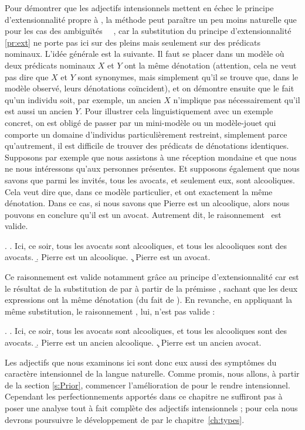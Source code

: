 Pour démontrer que les adjectifs intensionnels mettent en échec le principe d'extensionnalité propre à {\LO}, la méthode peut paraître un peu moins naturelle que pour les cas des ambiguïtés \dedicto\ \vs\ \dere, car la substitution du principe d'extensionnalité \ref{pr:ext} ne porte pas ici sur des {\GN} pleins mais  seulement sur des prédicats nominaux. L'idée générale est la suivante. Il faut se placer dans un modèle où deux prédicats nominaux $X$ et $Y$ ont la même dénotation (attention, cela ne veut pas dire que $X$ et $Y$ sont synonymes, mais simplement qu'il se trouve que, dans le modèle observé, leurs dénotations coïncident), et on démontre ensuite que le fait qu'un individu soit, par exemple, un ancien $X$ n'implique pas nécessairement qu'il est aussi un ancien $Y$.  
Pour illustrer cela linguistiquement avec un exemple concret, on est obligé de passer par un mini-modèle ou un modèle-jouet qui comporte un domaine d'individus particulièrement restreint, simplement parce qu'autrement, il est difficile de trouver des prédicats de dénotations identiques. Supposons par exemple que nous assistons à une réception mondaine et que nous ne nous intéressons qu'aux personnes présentes. Et supposons également que nous savons que parmi les invités, tous les avocats, et seulement eux, sont alcooliques. Cela veut dire que, dans ce modèle particulier,  et  ont exactement la même dénotation. Dans ce cas, si nous savons que Pierre est un alcoolique, alors nous pouvons en conclure qu'il est un avocat. Autrement dit, le raisonnement \Next\ est valide.

\largerpage[-1]

\ex.
\a. Ici, ce soir, tous les avocats sont alcooliques, et tous les alcooliques %
sont des avocats.
\b. Pierre est un alcoolique.
\c. \juge{\small$\satisf\:$}  Pierre est un avocat.


Ce raisonnement est valide notamment grâce au principe d'extensionnalité car \Last[c] est le résultat de la substitution de  par  à partir de la prémisse \Last[b], sachant que les deux expressions ont la même dénotation (du fait de \Last[a]). En revanche, en appliquant la même substitution, le raisonnement {\Next}, lui, n'est pas valide :

\ex.
\a. Ici, ce soir, tous les avocats sont alcooliques, et tous les alcooliques %
sont des avocats.
\b. Pierre est un ancien alcoolique.
\c. \juge{\small$\not\satisf\:$}  Pierre est un ancien  avocat.


Les adjectifs que nous examinons ici sont donc eux aussi des symptômes du caractère intensionnel de la langue naturelle. Comme promis, nous allons, à partir de la section \ref{s:Prior}, commencer l'amélioration de {\LO} pour le rendre intensionnel. Cependant les perfectionnements apportés dans ce chapitre ne suffiront pas à poser une analyse tout à fait complète des adjectifs intensionnels ; pour cela nous devrons poursuivre le développement de {\LO} par le chapitre~\ref{ch:types}. %


